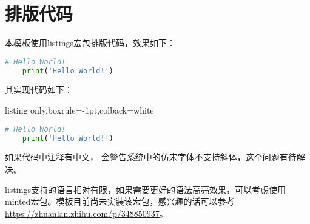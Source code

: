 \section{排版代码}

本模板使用listings宏包排版代码，效果如下：
\begin{lstlisting}[breaklines=true,language=Python]
    # Hello World!
    print('Hello World!')
\end{lstlisting}

其实现代码如下：
\begin{tcblisting}{listing only,boxrule=-1pt,colback=white}
\begin{lstlisting}[breaklines=true,language=Python]
    # Hello World!
    print('Hello World!')
\end{lstlisting}
\end{tcblisting}

如果代码中注释有中文，\XeLaTeX{} 会警告系统中的仿宋字体不支持斜体，这个问题有待解决。

listings支持的语言相对有限，如果需要更好的语法高亮效果，可以考虑使用minted宏包。模板目前尚未实装该宏包，感兴趣的话可以参考\url{https://zhuanlan.zhihu.com/p/348850937}。